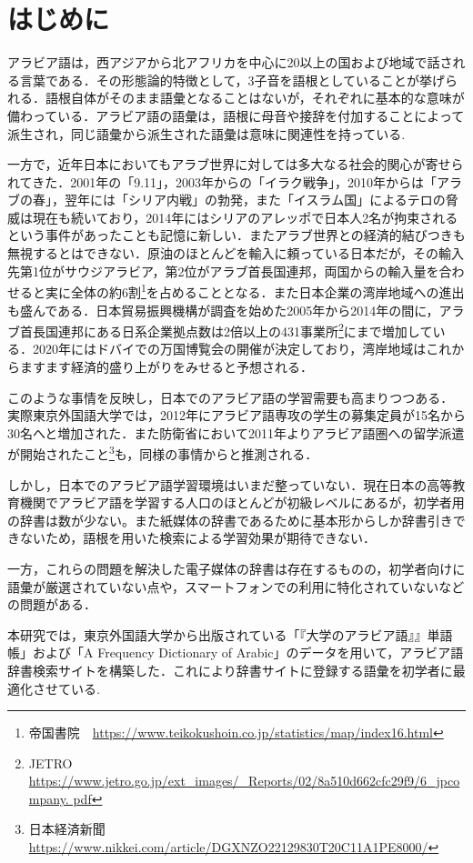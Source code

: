 \documentclass[technicalreport]{ieicej}
\begin{document}
\section{はじめに}
アラビア語は，西アジアから北アフリカを中心に20以上の国および地域で話される言葉である．その形態論的特徴として，3子音を語根としていることが挙げられる．語根自体がそのまま語彙となることはないが，それぞれに基本的な意味が備わっている．アラビア語の語彙は，語根に母音や接辞を付加することによって派生され，同じ語彙から派生された語彙は意味に関連性を持っている. 

一方で，近年日本においてもアラブ世界に対しては多大なる社会的関心が寄せられてきた．2001年の「9.11」，2003年からの「イラク戦争」，2010年からは「アラブの春」，翌年には「シリア内戦」の勃発，また「イスラム国」によるテロの脅威は現在も続いており，2014年にはシリアのアレッポで日本人2名が拘束されるという事件があったことも記憶に新しい．またアラブ世界との経済的結びつきも無視するとはできない．原油のほとんどを輸入に頼っている日本だが，その輸入先第1位がサウジアラビア，第2位がアラブ首長国連邦，両国からの輸入量を合わせると実に全体の約6割\footnote{帝国書院　\url{https://www.teikokushoin.co.jp/statistics/map/index16.html}}を占めることとなる．また日本企業の湾岸地域への進出も盛んである．日本貿易振興機構が調査を始めた2005年から2014年の間に，アラブ首長国連邦にある日系企業拠点数は2倍以上の431事業所\footnote{JETRO　\url{https://www.jetro.go.jp/ext_images/_Reports/02/8a510d662cfc29f9/6_jpcompany. pdf}}にまで増加している．2020年にはドバイでの万国博覧会の開催が決定しており，湾岸地域はこれからますます経済的盛り上がりをみせると予想される．

このような事情を反映し，日本でのアラビア語の学習需要も高まりつつある．実際東京外国語大学では，2012年にアラビア語専攻の学生の募集定員が15名から30名へと増加された．また防衛省において2011年よりアラビア語圏への留学派遣が開始されたこと\footnote{日本経済新聞 \url{https://www.nikkei.com/article/DGXNZO22129830T20C11A1PE8000/}}も，同様の事情からと推測される．

しかし，日本でのアラビア語学習環境はいまだ整っていない．現在日本の高等教育機関でアラビア語を学習する人口のほとんどが初級レベルにあるが，初学者用の辞書は数が少ない。また紙媒体の辞書であるために基本形からしか辞書引きできないため，語根を用いた検索による学習効果が期待できない．

一方，これらの問題を解決した電子媒体の辞書は存在するものの，初学者向けに語彙が厳選されていない点や，スマートフォンでの利用に特化されていないなどの問題がある．

本研究では，東京外国語大学から出版されている「『大学のアラビア語』』単語帳」および「A Frequency Dictionary of Arabic」のデータを用いて，アラビア語辞書検索サイトを構築した．これにより辞書サイトに登録する語彙を初学者に最適化させている.
\end{document}
